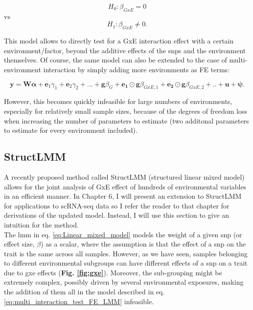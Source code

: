\begin{equation}
 H_{0}: \beta_{GxE}=0 
\end{equation}
vs
\begin{equation}
 H_{1}: \beta_{GxE} \neq 0. 
\end{equation}

This model allows to directly test for a GxE interaction effect with a certain environment/factor, beyond the additive effects of the \gls{snp}s and the environment themselves. 
Of course, the same model can also be extended to the case of multi-environment interaction by simply adding more environments as FE terms:

\begin{equation}\label{eq:multi_interaction_test_FE_LMM}
 \mathbf{y} =  \mathbf{W}\boldsymbol{\alpha} + \mathbf{e}_1\gamma_1 + \mathbf{e}_2\gamma_2 + ...  + \mathbf{g}\beta_G + \mathbf{e_1}\odot\mathbf{g}\beta_{GxE,1}+ \mathbf{e_2}\odot\mathbf{g}\beta_{GxE,2} + .. + \mathbf{u} + \boldsymbol{\psi}. 
\end{equation}

However, this becomes quickly infeasible for large numbers of environments, especially for relatively small sample sizes, because of the degrees of freedom loss when increasing the number of parameters to estimate (two additonal parameters to estimate for every environment included).


\subsection{StructLMM}
\label{sec:struct_lmm}

A recently proposed method called StructLMM (structured linear mixed model) allows for the joint analysis of GxE effect of hundreds of environmental variables \cite{moore2019linear} in an efficient manner.
In Chapter 6, I will present an extension to StructLMM for applications to scRNA-seq data so I refer the reader to that chapter for derivations of the updated model.
Instead, I will use this section to give an intuition for the method.\\

The \gls{lmm} in eq. \eqref{eq:Linear_mixed_model} models the weight of a given \gls{snp} (or effect size, $\beta$) as a scalar, where the assumption is that the effect of a \gls{snp} on the trait is the same across all samples.
However, as we have seen, samples belonging to different environmental subgroups can have different effects of a \gls{snp} on a trait due to \gls{gxe} effects (\textbf{Fig. \ref{fig:gxe}}).
Moreover, the sub-grouping might be extremely complex, possibly driven by several environmental exposures, making the addition of them all in the model described in eq. \eqref{eq:multi_interaction_test_FE_LMM} infeasible.

